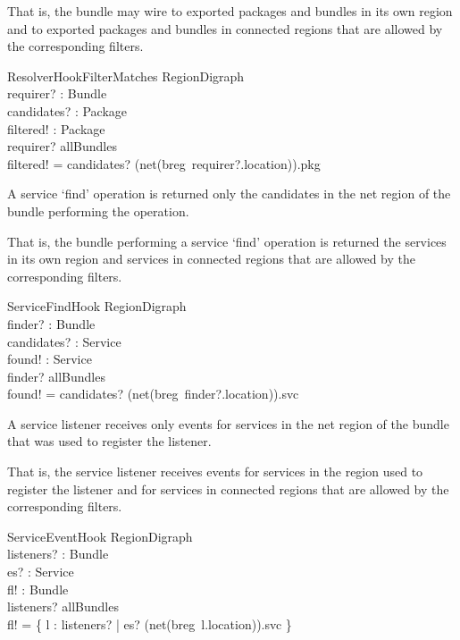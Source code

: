 \documentclass[a4paper,9pt,twoside]{article}
\begin{document}
That is, the bundle may wire to exported packages and bundles in its own region and to
exported packages and bundles in connected regions that are allowed by the corresponding filters.
\begin{schema}{ResolverHookFilterMatches}
  \Xi RegionDigraph \\
  requirer? : Bundle \\
  candidates? : \power Package \\
  filtered! : \power Package \\
\where
  requirer? \in allBundles \\
  filtered! = candidates? \cap (net(breg~requirer?.location)).pkg \\
\end{schema}

A service `find' operation is returned only the
candidates in the net region of the bundle performing the operation.

That is, the bundle performing a service `find' operation is returned the services in its own region
and services in connected regions that are allowed by the corresponding filters.
\begin{schema}{ServiceFindHook}
  \Xi RegionDigraph \\
  finder? : Bundle \\
  candidates? : \power Service \\
  found! : \power Service \\
\where
  finder? \in allBundles \\
  found! = candidates? \cap (net(breg~finder?.location)).svc \\
\end{schema}

A service listener receives only events for services in the net region of the bundle that was used
to register the listener.

That is, the service listener receives events for services in the region used to register the listener
and for services in connected regions that are allowed by the corresponding filters.
\begin{schema}{ServiceEventHook}
  \Xi RegionDigraph \\
  listeners? : \power Bundle \\
  es? : Service \\
  fl! : \power Bundle \\
\where
  listeners? \subseteq allBundles \\
  fl! = \{ l : listeners? | es? \in (net(breg~l.location)).svc \} \\
\end{schema}
\end{document}

